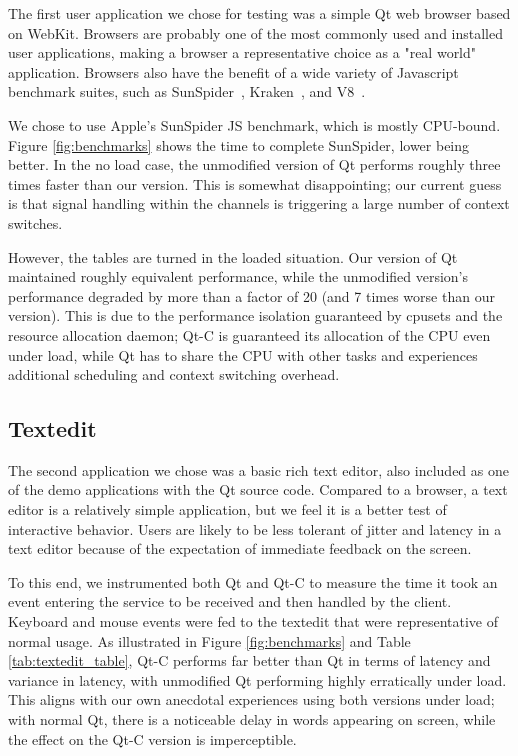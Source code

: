 \documentclass[letterpaper,twocolumn,10pt]{article}
\begin{document}
The first user application we chose for testing was a simple Qt web browser based on WebKit. Browsers are probably one of the most commonly used and installed user applications, making a browser a representative choice as a "real world" application. Browsers also have the benefit of a wide variety of Javascript benchmark suites, such as SunSpider~\cite{sunspider}, Kraken~\cite{kraken}, and V8~\cite{v8benchmark}.

We chose to use Apple's SunSpider JS benchmark, which is mostly CPU-bound. Figure \ref{fig:benchmarks} shows the time to complete SunSpider, lower being better. In the no load case, the unmodified version of Qt performs roughly three times faster than our version. This is somewhat disappointing; our current guess is that signal handling within the channels is triggering a large number of context switches.

However, the tables are turned in the loaded situation. Our version of Qt maintained roughly equivalent performance, while the unmodified version's performance degraded by more than a factor of 20 (and 7 times worse than our version). This is due to the performance isolation guaranteed by cpusets and the resource allocation daemon; Qt-C is guaranteed its allocation of the CPU even under load, while Qt has to share the CPU with other tasks and experiences additional scheduling and context switching overhead.

\subsection{Textedit}

The second application we chose was a basic rich text editor, also included as one of the demo applications with the Qt source code. Compared to a browser, a text editor is a relatively simple application, but we feel it is a better test of interactive behavior. Users are likely to be less tolerant of jitter and latency in a text editor because of the expectation of immediate feedback on the screen. 

To this end, we instrumented both Qt and Qt-C to measure the time it took an event entering the service to be received and then handled by the client. Keyboard and mouse events were fed to the textedit that were representative of normal usage. As illustrated in Figure \ref{fig:benchmarks} and Table \ref{tab:textedit_table}, Qt-C performs far better than Qt in terms of latency and variance in latency, with unmodified Qt performing highly erratically under load. This aligns with our own anecdotal experiences using both versions under load; with normal Qt, there is a noticeable delay in words appearing on screen, while the effect on the Qt-C version is imperceptible.
\end{document}
